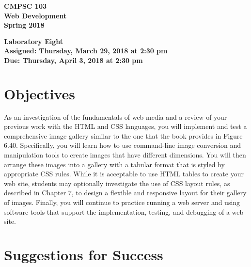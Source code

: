 \documentclass[11pt]{article}
\newcommand{\assignmentduedate}{April 3}
\newcommand{\assignmentassignedate}{March 29}
\newcommand{\assignmentnumber}{Eight}
\newcommand{\labyear}{2018}
\newcommand{\labday}{Thursday}
\newcommand{\labtime}{2:30 pm}
\newcommand{\assigneddate}{Assigned: \labday, \assignmentassignedate, \labyear{} at \labtime{}}
\newcommand{\duedate}{Due: \labday, \assignmentduedate, \labyear{} at \labtime{}}
\newcommand{\labtitle}[1]
{
  \begin{center}
    \begin{center}
      \bf
      CMPSC 103\\Web Development\\
      Spring 2018\\
      \medskip
    \end{center}
    \bf
    #1
  \end{center}
}
\begin{document}
\thispagestyle{empty}

\labtitle{Laboratory \assignmentnumber{} \\ \assigneddate{} \\ \duedate{}}

\section*{Objectives}

As an investigation of the fundamentals of web media and a review of your
previous work with the HTML and CSS languages, you will implement and test a
comprehensive image gallery similar to the one that the book provides in Figure
6.40. Specifically, you will learn how to use command-line image conversion and
manipulation tools to create images that have different dimensions. You will
then arrange these images into a gallery with a tabular format that is styled by
appropriate CSS rules. While it is acceptable to use HTML tables to create your
web site, students may optionally investigate the use of CSS layout rules, as
described in Chapter 7, to design a flexible and responsive layout for their
gallery of images. Finally, you will continue to practice running a web server
and using software tools that support the implementation, testing, and debugging
of a web site.

\section*{Suggestions for Success}
\end{document}
